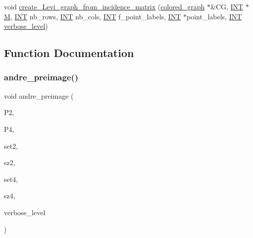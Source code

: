 \begin{DoxyCompactItemize}
\item 
void \mbox{\hyperlink{galois__global_8_c_a985e3f3df23d58f6aa691ba3e5e6f249}{create\+\_\+\+Levi\+\_\+graph\+\_\+from\+\_\+incidence\+\_\+matrix}} (\mbox{\hyperlink{classcolored__graph}{colored\+\_\+graph}} $\ast$\&CG, \mbox{\hyperlink{galois_8h_a09fddde158a3a20bd2dcadb609de11dc}{I\+NT}} $\ast$\mbox{\hyperlink{plane__search_8_c_ad2d23ebd03187a91edd45b1d5e496265}{M}}, \mbox{\hyperlink{galois_8h_a09fddde158a3a20bd2dcadb609de11dc}{I\+NT}} nb\+\_\+rows, \mbox{\hyperlink{galois_8h_a09fddde158a3a20bd2dcadb609de11dc}{I\+NT}} nb\+\_\+cols, \mbox{\hyperlink{galois_8h_a09fddde158a3a20bd2dcadb609de11dc}{I\+NT}} f\+\_\+point\+\_\+labels, \mbox{\hyperlink{galois_8h_a09fddde158a3a20bd2dcadb609de11dc}{I\+NT}} $\ast$point\+\_\+labels, \mbox{\hyperlink{galois_8h_a09fddde158a3a20bd2dcadb609de11dc}{I\+NT}} \mbox{\hyperlink{simeon_8_c_a818073fbcc2f439e7c56952f67386122}{verbose\+\_\+level}})
\end{DoxyCompactItemize}


\subsection{Function Documentation}
\mbox{\label{galois__global_8_c_a02f5cab8bad36069248da9307aba3625}} 
\subsubsection{\texorpdfstring{andre\+\_\+preimage()}{andre\_preimage()}}
{\footnotesize\ttfamily void andre\+\_\+preimage (\begin{DoxyParamCaption}\item[{\mbox{\hyperlink{classprojective__space}{projective\+\_\+space}} $\ast$}]{P2,  }\item[{\mbox{\hyperlink{classprojective__space}{projective\+\_\+space}} $\ast$}]{P4,  }\item[{\mbox{\hyperlink{galois_8h_a09fddde158a3a20bd2dcadb609de11dc}{I\+NT}} $\ast$}]{set2,  }\item[{\mbox{\hyperlink{galois_8h_a09fddde158a3a20bd2dcadb609de11dc}{I\+NT}}}]{sz2,  }\item[{\mbox{\hyperlink{galois_8h_a09fddde158a3a20bd2dcadb609de11dc}{I\+NT}} $\ast$}]{set4,  }\item[{\mbox{\hyperlink{galois_8h_a09fddde158a3a20bd2dcadb609de11dc}{I\+NT}} \&}]{sz4,  }\item[{\mbox{\hyperlink{galois_8h_a09fddde158a3a20bd2dcadb609de11dc}{I\+NT}}}]{verbose\+\_\+level }\end{DoxyParamCaption})}


